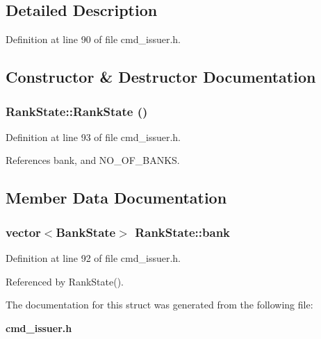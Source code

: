 \subsection{Detailed Description}


Definition at line 90 of file cmd\_\-issuer.h.

\subsection{Constructor \& Destructor Documentation}
\subsubsection[{RankState}]{\setlength{\rightskip}{0pt plus 5cm}RankState::RankState ()\hspace{0.3cm}{\tt  [inline]}}\label{structRankState_56184cca248259f03cd7dc2de0f495fc}




Definition at line 93 of file cmd\_\-issuer.h.

References bank, and NO\_\-OF\_\-BANKS.

\subsection{Member Data Documentation}
\subsubsection[{bank}]{\setlength{\rightskip}{0pt plus 5cm}vector$<${\bf BankState}$>$ {\bf RankState::bank}}\label{structRankState_3bccebe16e7c088968aee892cdfea434}




Definition at line 92 of file cmd\_\-issuer.h.

Referenced by RankState().

The documentation for this struct was generated from the following file:\begin{CompactItemize}
\item 
{\bf cmd\_\-issuer.h}\end{CompactItemize}
